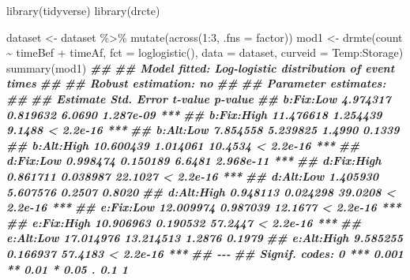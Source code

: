 \documentclass[
]{book}
\newenvironment{Shaded}{\begin{snugshade}}{\end{snugshade}}
\newcommand{\AttributeTok}[1]{\textcolor[rgb]{0.77,0.63,0.00}{#1}}
\newcommand{\DecValTok}[1]{\textcolor[rgb]{0.00,0.00,0.81}{#1}}
\newcommand{\DocumentationTok}[1]{\textcolor[rgb]{0.56,0.35,0.01}{\textbf{\textit{#1}}}}
\newcommand{\FunctionTok}[1]{\textcolor[rgb]{0.00,0.00,0.00}{#1}}
\newcommand{\NormalTok}[1]{#1}
\newcommand{\OtherTok}[1]{\textcolor[rgb]{0.56,0.35,0.01}{#1}}
\newcommand{\SpecialCharTok}[1]{\textcolor[rgb]{0.00,0.00,0.00}{#1}}
\begin{document}
\begin{Shaded}
\begin{Highlighting}[]
\FunctionTok{library}\NormalTok{(tidyverse)}
\FunctionTok{library}\NormalTok{(drcte)}

\NormalTok{dataset }\OtherTok{\textless{}{-}}\NormalTok{ dataset }\SpecialCharTok{\%\textgreater{}\%} 
  \FunctionTok{mutate}\NormalTok{(}\FunctionTok{across}\NormalTok{(}\DecValTok{1}\SpecialCharTok{:}\DecValTok{3}\NormalTok{, }\AttributeTok{.fns =}\NormalTok{ factor))}
\NormalTok{mod1 }\OtherTok{\textless{}{-}} \FunctionTok{drmte}\NormalTok{(count }\SpecialCharTok{\textasciitilde{}}\NormalTok{ timeBef }\SpecialCharTok{+}\NormalTok{ timeAf, }\AttributeTok{fct =} \FunctionTok{loglogistic}\NormalTok{(),}
            \AttributeTok{data =}\NormalTok{ dataset, }
            \AttributeTok{curveid =}\NormalTok{ Temp}\SpecialCharTok{:}\NormalTok{Storage)}
\FunctionTok{summary}\NormalTok{(mod1)}
\DocumentationTok{\#\# }
\DocumentationTok{\#\# Model fitted: Log{-}logistic distribution of event times}
\DocumentationTok{\#\# }
\DocumentationTok{\#\# Robust estimation: no }
\DocumentationTok{\#\# }
\DocumentationTok{\#\# Parameter estimates:}
\DocumentationTok{\#\# }
\DocumentationTok{\#\#             Estimate Std. Error t{-}value   p{-}value    }
\DocumentationTok{\#\# b:Fix:Low   4.974317   0.819632  6.0690 1.287e{-}09 ***}
\DocumentationTok{\#\# b:Fix:High 11.476618   1.254439  9.1488 \textless{} 2.2e{-}16 ***}
\DocumentationTok{\#\# b:Alt:Low   7.854558   5.239825  1.4990    0.1339    }
\DocumentationTok{\#\# b:Alt:High 10.600439   1.014061 10.4534 \textless{} 2.2e{-}16 ***}
\DocumentationTok{\#\# d:Fix:Low   0.998474   0.150189  6.6481 2.968e{-}11 ***}
\DocumentationTok{\#\# d:Fix:High  0.861711   0.038987 22.1027 \textless{} 2.2e{-}16 ***}
\DocumentationTok{\#\# d:Alt:Low   1.405930   5.607576  0.2507    0.8020    }
\DocumentationTok{\#\# d:Alt:High  0.948113   0.024298 39.0208 \textless{} 2.2e{-}16 ***}
\DocumentationTok{\#\# e:Fix:Low  12.009974   0.987039 12.1677 \textless{} 2.2e{-}16 ***}
\DocumentationTok{\#\# e:Fix:High 10.906963   0.190532 57.2447 \textless{} 2.2e{-}16 ***}
\DocumentationTok{\#\# e:Alt:Low  17.014976  13.214513  1.2876    0.1979    }
\DocumentationTok{\#\# e:Alt:High  9.585255   0.166937 57.4183 \textless{} 2.2e{-}16 ***}
\DocumentationTok{\#\# {-}{-}{-}}
\DocumentationTok{\#\# Signif. codes:  0 \textquotesingle{}***\textquotesingle{} 0.001 \textquotesingle{}**\textquotesingle{} 0.01 \textquotesingle{}*\textquotesingle{} 0.05 \textquotesingle{}.\textquotesingle{} 0.1 \textquotesingle{} \textquotesingle{} 1}
\end{Highlighting}
\end{Shaded}
\end{document}
